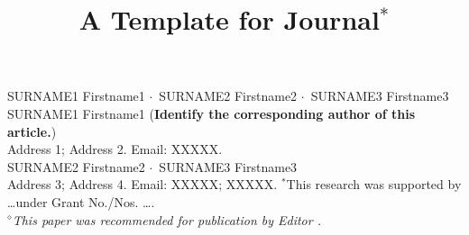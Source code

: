 \documentclass{jssc}
\def\cdd{\mbox{\boldmath$\cdot$}~}
\begin{document}
\title{A Template for Journal$^*$}%
{\uppercase{Surname1} Firstname1 \cdd \uppercase{Surname2}
Firstname2 \cdd \uppercase{Surname3} Firstname3}%
{\uppercase{Surname1} Firstname1 ({\bf Identify the corresponding author of this article.})\\
Address 1; Address 2.  Email: XXXXX. \\   %
\uppercase{Surname2} Firstname2   \cdd \uppercase{Surname3} Firstname3 \\
Address 3; Address 4.  Email: XXXXX; XXXXX.}%
{$^*$This research was supported by \ldots under Grant No./Nos.
\ldots.\\
{$^\diamond${\it This paper was recommended for publication by Editor . }}
 }


\end{document}
